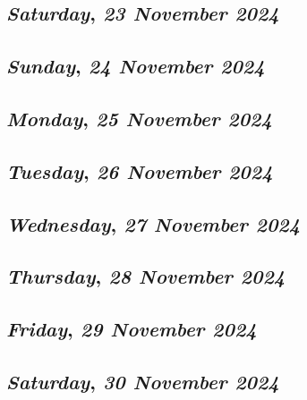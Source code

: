 \def\day{\textit{23 November 2024}}
\def\weekday{\textit{Saturday}}
\subsection*{\weekday, \day}

\def\day{\textit{24 November 2024}}
\def\weekday{\textit{Sunday}}
\subsection*{\weekday, \day}

\def\day{\textit{25 November 2024}}
\def\weekday{\textit{Monday}}
\subsection*{\weekday, \day}

\def\day{\textit{26 November 2024}}
\def\weekday{\textit{Tuesday}}
\subsection*{\weekday, \day}

\def\day{\textit{27 November 2024}}
\def\weekday{\textit{Wednesday}}
\subsection*{\weekday, \day}

\def\day{\textit{28 November 2024}}
\def\weekday{\textit{Thursday}}
\subsection*{\weekday, \day}

\def\day{\textit{29 November 2024}}
\def\weekday{\textit{Friday}}
\subsection*{\weekday, \day}

\def\day{\textit{30 November 2024}}
\def\weekday{\textit{Saturday}}
\subsection*{\weekday, \day}
